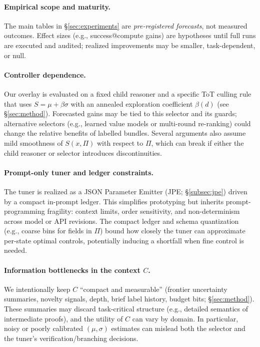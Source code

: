\documentclass{article}
\theoremstyle{plain}
\theoremstyle{definition}
\theoremstyle{remark}
\begin{document}
\paragraph{Empirical scope and maturity.}
The main tables in \S\ref{sec:experiments} are \emph{pre-registered forecasts}, not measured outcomes. Effect sizes (e.g., success@compute gains) are hypotheses until full runs are executed and audited; realized improvements may be smaller, task-dependent, or null.

\paragraph{Controller dependence.}
Our overlay is evaluated on a fixed child reasoner and a specific ToT culling rule that uses $S=\mu+\beta\sigma$ with an annealed exploration coefficient $\beta(d)$ (see \S\ref{sec:method}). Forecasted gains may be tied to this selector and its guards; alternative selectors (e.g., learned value models or multi-round re-ranking) could change the relative benefits of labelled bundles. Several arguments also assume mild smoothness of $S(x,\Pi)$ with respect to $\Pi$, which can break if either the child reasoner or selector introduces discontinuities.

\paragraph{Prompt-only tuner and ledger constraints.}
The tuner is realized as a JSON Parameter Emitter (JPE; \S\ref{subsec:jpe}) driven by a compact in-prompt ledger. This simplifies prototyping but inherits prompt-programming fragility: context limits, order sensitivity, and non-determinism across model or API revisions. The compact ledger and schema quantization (e.g., coarse bins for fields in $\Pi$) bound how closely the tuner can approximate per-state optimal controls, potentially inducing a shortfall when fine control is needed.

\paragraph{Information bottlenecks in the context $C$.}
We intentionally keep $C$ ``compact and measurable'' (frontier uncertainty summaries, novelty signals, depth, brief label history, budget bits; \S\ref{sec:method}). These summaries may discard task-critical structure (e.g., detailed semantics of intermediate proofs), and the utility of $C$ can vary by domain. In particular, noisy or poorly calibrated $(\mu,\sigma)$ estimates can mislead both the selector and the tuner's verification/branching decisions.
\end{document}
